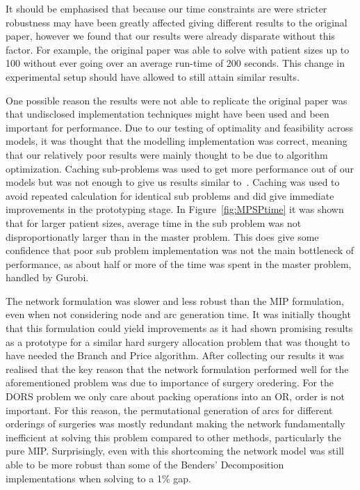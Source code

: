 It should be emphasised that because our time constraints are were stricter robustness may have been greatly affected giving different results to the original paper, however we found that our results were already disparate without this factor. For example, the original paper was able to solve with patient sizes up to 100 without ever going over an average run-time of 200 seconds. This change in experimental setup should have allowed to still attain similar results.

One possible reason the results were not able to replicate the original paper was that undisclosed implementation techniques might have been used and been important for performance. Due to our testing of optimality and feasibility across models, it was thought that the modelling implementation was correct, meaning that our relatively poor results were mainly thought to be due to algorithm optimization. Caching sub-problems was used to get more performance out of our models but was not enough to give us results similar to~\cite{roshanaei2017propagating}. Caching was used to avoid repeated calculation for identical sub problems and did give immediate improvements in the prototyping stage. In Figure~\ref{fig:MPSPtime} it was shown that for larger patient sizes, average time in the sub problem was not disproportionatly larger than in the master problem. This does give some confidence that poor sub problem implementation was not the main bottleneck of performance, as about half or more of the time was spent in the master problem, handled by Gurobi. 

The network formulation was slower and less robust than the MIP formulation, even when not considering node and arc generation time. It was initially thought that this formulation could yield improvements as it had shown promising results as a prototype for a similar hard surgery allocation problem that was thought to have needed the Branch and Price algorithm\cite{DoulabiBranchPriceOR}. After collecting our results it was realised that the key reason that the network formulation performed well for the aforementioned problem was due to importance of surgery oredering. For the DORS problem we only care about packing operations into an OR, order is not important. For this reason, the permutational generation of arcs for different orderings of surgeries was mostly redundant making the network fundamentally inefficient at solving this problem compared to other methods, particularly the pure MIP. Surprisingly, even with this shortcoming the network model was still able to be more robust than some of the Benders' Decomposition implementations when solving to a 1\% gap.

